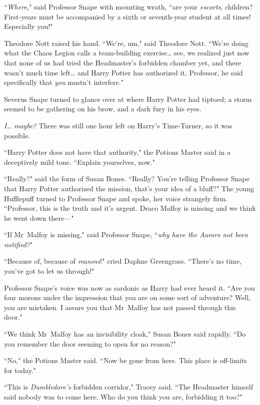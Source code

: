``\emph{Where,}" said Professor Snape with mounting wrath, ``are your \emph{escorts}, children? First-years must be accompanied by a sixth or seventh-year student at all times! Especially you!"

Theodore Nott raised his hand. ``We're, um," said Theodore Nott. ``We're doing what the Chaos Legion calls a team-building exercise{\ldots} see, we realized just now that none of us had tried the Headmaster's forbidden chamber yet, and there wasn't much time left{\ldots} and Harry Potter has authorized it, Professor, he said specifically that \emph{you} mustn't interfere."

Severus Snape turned to glance over at where Harry Potter had tiptoed; a storm seemed to be gathering on his brow, and a dark fury in his eyes.

\emph{I{\ldots} maybe?} There was still one hour left on Harry's Time-Turner, so it was possible.

``Harry Potter does not have that authority," the Potions Master said in a deceptively mild tone. ``Explain yourselves, now."

``Really?" said the form of Susan Bones. ``Really? You're telling Professor Snape that Harry Potter authorized the mission, that's your idea of a bluff?" The young Hufflepuff turned to Professor Snape and spoke, her voice strangely firm. ``Professor, this is the truth and it's urgent. Draco Malfoy is missing and we think he went down there—"

``If Mr~Malfoy is missing," said Professor Snape, ``\emph{why have the Aurors not been notified?}"

``Because of, because of \emph{reasons}!" cried Daphne Greengrass. ``There's no time, you've got to let us through!"

Professor Snape's voice was now as sardonic as Harry had ever heard it. ``Are you four morons under the impression that you are on some sort of adventure? Well, you are mistaken. I assure you that Mr~Malfoy has not passed through this door."

``We think Mr~Malfoy has an invisibility cloak," Susan Bones said rapidly. ``Do you remember the door seeming to open for no reason?"

``No," the Potions Master said. ``Now be gone from here. This place is off-limits for today."

``This is \emph{Dumbledore's} forbidden corridor," Tracey said. ``The Headmaster himself said nobody was to come here. Who do you think you are, forbidding it too?"

